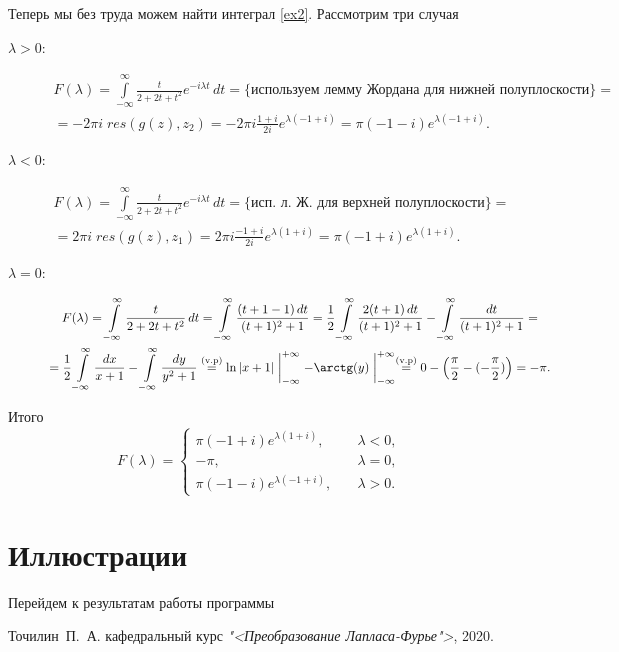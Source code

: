 \documentclass[oneside,final,11pt]{article}
\newcommand\abs[1]	{|#1|}
\newcommand\lm{\lambda}
\newcommand\comm[1]{\bigl\{\text{#1}\bigr\}}
\newcommand\updwninfint[1]{\int\limits_{-\infty}^{\infty} #1 \, dt}
\newcommand\ft[1]{\updwninfint{#1 e^{-i \lm t}}}
\begin{document}
			\par
			Теперь мы без труда можем найти интеграл \eqref{ex2}. Рассмотрим три случая
			\begin{description}
			\item[\(\lm > 0 :\)]
				\begin{multline*} F(\lm) = \ft{\frac{t}{2+2t+t^2}} = \comm{используем лемму Жордана для нижней
				полуплоскости} =\\
				= -2\pi i\; res(g(z),z_2) = -2\pi i \frac{1+i}{2i} e^{\lm (-1+i)} = \pi (-1-i) e^{\lm (-1+i)}.
				\end{multline*}
			\item[\(\lm < 0 :\)]
				\begin{multline*} F(\lm) = \ft{\frac{t}{2+2t+t^2}} = \comm{исп. л. Ж. для верхней полуплоскости} = \\
				= 2\pi i\; res(g(z),z_1) = 2\pi i \frac{-1+i}{2i} e^{\lm (1+i)} = \pi (-1+i) e^{\lm(1+i)}.
				\end{multline*}
			\item[\(\lm = 0 :\)]
				\begin{multline*}
				F(\lm) = \updwninfint{\frac{t}{2+2t+t^2}} =
				\int\limits_{-\infty}^{\infty} \frac{(t+1-1)\,dt}{(t+1)^2 + 1} =
				\frac{1}{2} \int\limits_{-\infty}^{\infty} \frac{2(t+1)\,dt}{(t+1)^2 + 1} -
				\int\limits_{-\infty}^{\infty} \frac{dt}{(t+1)^2+1} = \\
				= \frac{1}{2} \int\limits_{-\infty}^{\infty} \frac{dx}{x+1} - \int\limits_{-\infty}^{\infty} \frac{dy}{y^2+1}
				\stackrel{\text{(v.p)}}{=} \ln \abs{x+1}\biggm|_{-\infty}^{+\infty} -
				\arctg(y)\biggm|_{-\infty}^{+\infty} \stackrel{\text{(v.p)}}{=} 0 - \Bigl(\frac{\pi}{2} - (-\frac{\pi}{2})\Bigr)
				= -\pi.
				\end{multline*}
			\end{description}
			Итого
			\begin{equation} \label{F_2}
			F(\lm) = \left\{\begin{aligned}
				\pi (-1+i) e^{\lm(1+i)},&\quad \lm < 0, \\
				-\pi,&\quad \lm = 0, \\
				\pi (-1-i) e^{\lm (-1+i)},&\quad \lm >0. \end{aligned}\right.
			\end{equation}

	\section{Иллюстрации}
		Перейдем к результатам работы программы
	
	\begin{thebibliography}{0}
		 Точилин~П.~А. кафедральный курс \emph{"<Преобразование Лапласа-Фурье">}, 2020.
	\end{thebibliography}
\end{document}
